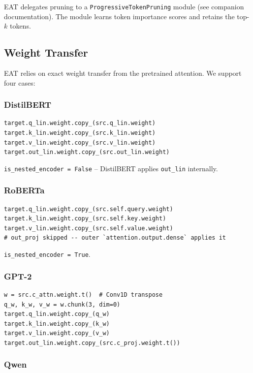 EAT delegates pruning to a \texttt{ProgressiveTokenPruning} module (see companion 
documentation). The module learns token importance scores and retains the 
top-$k$ tokens.

\subsection{Weight Transfer}

EAT relies on exact weight transfer from the pretrained attention. We 
support four cases:

\subsubsection{DistilBERT}

\begin{lstlisting}
target.q_lin.weight.copy_(src.q_lin.weight)
target.k_lin.weight.copy_(src.k_lin.weight)
target.v_lin.weight.copy_(src.v_lin.weight)
target.out_lin.weight.copy_(src.out_lin.weight)
\end{lstlisting}

\texttt{is\_nested\_encoder = False} -- DistilBERT applies \texttt{out\_lin} internally.

\subsubsection{RoBERTa}

\begin{lstlisting}
target.q_lin.weight.copy_(src.self.query.weight)
target.k_lin.weight.copy_(src.self.key.weight)
target.v_lin.weight.copy_(src.self.value.weight)
# out_proj skipped -- outer `attention.output.dense` applies it
\end{lstlisting}

\texttt{is\_nested\_encoder = True}.

\subsubsection{GPT-2}

\begin{lstlisting}
w = src.c_attn.weight.t()  # Conv1D transpose
q_w, k_w, v_w = w.chunk(3, dim=0)
target.q_lin.weight.copy_(q_w)
target.k_lin.weight.copy_(k_w)
target.v_lin.weight.copy_(v_w)
target.out_lin.weight.copy_(src.c_proj.weight.t())
\end{lstlisting}

\subsubsection{Qwen}

